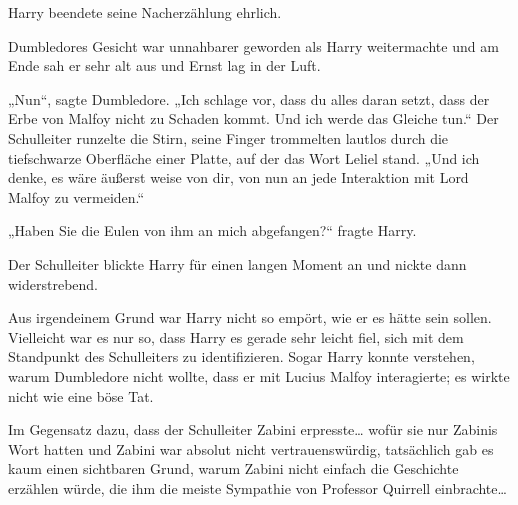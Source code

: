 Harry beendete seine Nacherzählung ehrlich.

Dumbledores Gesicht war unnahbarer geworden als Harry weitermachte und am Ende sah er sehr alt aus und Ernst lag in der Luft.

„Nun“, sagte Dumbledore. „Ich schlage vor, dass du alles daran setzt, dass der Erbe von Malfoy nicht zu Schaden kommt. Und ich werde das Gleiche tun.“ Der Schulleiter runzelte die Stirn, seine Finger trommelten lautlos durch die tiefschwarze Oberfläche einer Platte, auf der das Wort Leliel stand. „Und ich denke, es wäre äußerst weise von dir, von nun an jede Interaktion mit Lord Malfoy zu vermeiden.“

„Haben Sie die Eulen von ihm an mich abgefangen?“ fragte Harry.

Der Schulleiter blickte Harry für einen langen Moment an und nickte dann widerstrebend.

Aus irgendeinem Grund war Harry nicht so empört, wie er es hätte sein sollen. Vielleicht war es nur so, dass Harry es gerade sehr leicht fiel, sich mit dem Standpunkt des Schulleiters zu identifizieren. Sogar Harry konnte verstehen, warum Dumbledore nicht wollte, dass er mit Lucius Malfoy interagierte; es wirkte nicht wie eine böse Tat.

Im Gegensatz dazu, dass der Schulleiter Zabini erpresste… wofür sie nur Zabinis Wort hatten und Zabini war absolut nicht vertrauenswürdig, tatsächlich gab es kaum einen sichtbaren Grund, warum Zabini nicht einfach die Geschichte erzählen würde, die ihm die meiste Sympathie von Professor Quirrell einbrachte…

